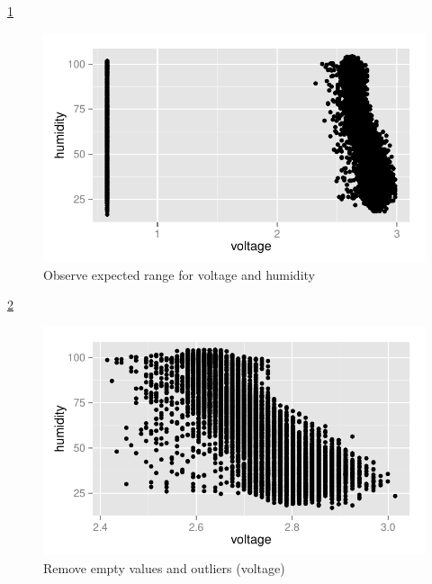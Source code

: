 \documentclass{article}\usepackage[]{graphicx}\usepackage[]{color}
\makeatletter
\def\maxwidth{ %
  \ifdim\Gin@nat@width>\linewidth
    \linewidth
  \else
    \Gin@nat@width
  \fi
}
\newenvironment{knitrout}{}{} %
\makeatother
\begin{document}
\ref{fig:plot_raw_voltage_humidity}
\begin{knitrout}
\color{fgcolor}\begin{figure}[h!]


{\centering \includegraphics[width=\maxwidth]{figure/plot_raw_voltage_humidity} 

}

\caption[Observe expected range for voltage and humidity]{Observe expected range for voltage and humidity\label{fig:plot_raw_voltage_humidity}}
\end{figure}


\end{knitrout}

\ref{fig:plot_cleansed_voltage_humidity}
\begin{knitrout}
\color{fgcolor}\begin{figure}[h!]


{\centering \includegraphics[width=\maxwidth]{figure/plot_cleansed_voltage_humidity} 

}

\caption[Remove empty values and outliers (voltage)]{Remove empty values and outliers (voltage)\label{fig:plot_cleansed_voltage_humidity}}
\end{figure}


\end{knitrout}
\end{document}
